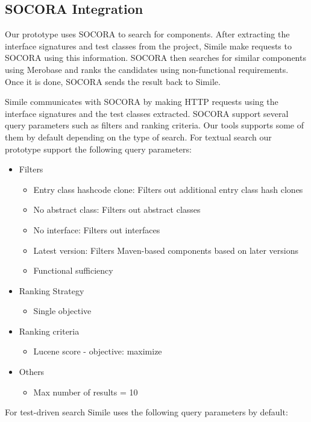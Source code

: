 {\subsection{SOCORA Integration}
\label{socora-integration}
Our prototype uses SOCORA to search for components. After extracting the interface signatures and test classes from the project, Simile make requests to SOCORA using this information. SOCORA then searches for similar components using Merobase and ranks the candidates using non-functional requirements. Once it is done, SOCORA sends the result back to Simile.

Simile communicates with SOCORA by making HTTP requests using the interface signatures and the test classes extracted. SOCORA support several query parameters such as filters and ranking criteria. Our tools supports some of them by default depending on the type of search. For textual search our prototype support the following query parameters:

\begin{itemize}
\item Filters
	\begin{itemize}
	\item Entry class hashcode clone: Filters out additional entry class hash clones
	\item No abstract class: Filters out abstract classes
	\item No interface: Filters out interfaces
	\item Latest version: Filters Maven-based components based on later versions
	\item Functional sufficiency
	\end{itemize}
\item Ranking Strategy
	\begin{itemize}
	\item Single objective
	\end{itemize}
\item Ranking criteria
	\begin{itemize}
	\item Lucene score - objective: maximize
	\end{itemize}
\item Others
	\begin{itemize}
	\item Max number of results = 10
	\end{itemize}
\end{itemize}

For test-driven search Simile uses the following query parameters by default:

}
